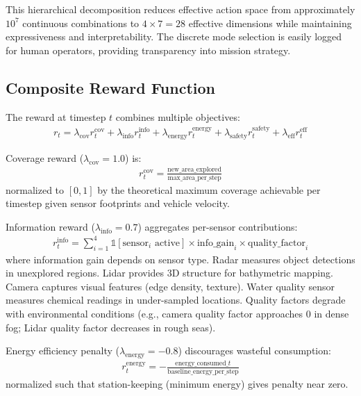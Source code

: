 This hierarchical decomposition reduces effective action space from approximately $10^7$ continuous combinations to $4 \times 7 = 28$ effective dimensions while maintaining expressiveness and interpretability. The discrete mode selection is easily logged for human operators, providing transparency into mission strategy.

\subsection{Composite Reward Function}

The reward at timestep $t$ combines multiple objectives:
\begin{align}
r_t = \lambda_{\text{cov}} r^{\text{cov}}_t + \lambda_{\text{info}} r^{\text{info}}_t + \lambda_{\text{energy}} r^{\text{energy}}_t + \lambda_{\text{safety}} r^{\text{safety}}_t + \lambda_{\text{eff}} r^{\text{eff}}_t
\end{align}

Coverage reward ($\lambda_{\text{cov}} = 1.0$) is:
\begin{align}
r^{\text{cov}}_t = \frac{\text{new\_area\_explored}}{\text{max\_area\_per\_step}}
\end{align}
normalized to $[0, 1]$ by the theoretical maximum coverage achievable per timestep given sensor footprints and vehicle velocity.

Information reward ($\lambda_{\text{info}} = 0.7$) aggregates per-sensor contributions:
\begin{align}
r^{\text{info}}_t = \sum_{i=1}^{4} \mathbb{1}[\text{sensor}_i \text{ active}] \times \text{info\_gain}_i \times \text{quality\_factor}_i
\end{align}
where information gain depends on sensor type. Radar measures object detections in unexplored regions. Lidar provides 3D structure for bathymetric mapping. Camera captures visual features (edge density, texture). Water quality sensor measures chemical readings in under-sampled locations. Quality factors degrade with environmental conditions (e.g., camera quality factor approaches 0 in dense fog; Lidar quality factor decreases in rough seas).

Energy efficiency penalty ($\lambda_{\text{energy}} = -0.8$) discourages wasteful consumption:
\begin{align}
r^{\text{energy}}_t = -\frac{\text{energy\_consumed}\_t}{\text{baseline\_energy\_per\_step}}
\end{align}
normalized such that station-keeping (minimum energy) gives penalty near zero.

